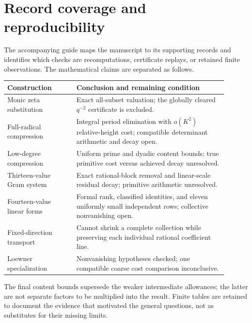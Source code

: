 \section{Record coverage and reproducibility}\label{app:records}
The accompanying guide maps the manuscript to its supporting records
and identifies which checks are recomputations, certificate replays,
or retained finite observations. The mathematical claims are separated
as follows.
\begin{center}\small
\begin{tabular}{p{0.29\linewidth}p{0.61\linewidth}}
\toprule
Construction&Conclusion and remaining condition\\\midrule
Monic zeta substitution&Exact all-subset valuation; the globally cleared
$q^{-2}$ certificate is excluded.\\
Full-radical compression&Integral period elimination with $o(K^2)$
relative-height cost; compatible determinant arithmetic and decay open.\\
Low-degree compression&Uniform prime and dyadic content bounds; true
primitive cost versus achieved decay unresolved.\\
Thirteen-value Gram system&Exact rational-block removal and linear-scale
residual decay; primitive arithmetic unresolved.\\
Fourteen-value linear forms&Formal rank, classified identities, and
eleven uniformly small independent rows; collective nonvanishing open.\\
Fixed-direction transport&Cannot shrink a complete collection while
preserving each individual rational coefficient line.\\
Loewner specialization&Nonvanishing hypotheses checked; one compatible
coarse cost comparison inconclusive.\\\bottomrule
\end{tabular}
\end{center}
The final content bounds supersede the weaker intermediate allowances;
the latter are not separate factors to be multiplied into the result.
Finite tables are retained to document the evidence that motivated
the general questions, not as substitutes for their missing limits.
